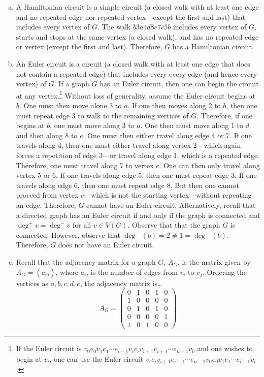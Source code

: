 \documentclass[11pt,letterpaper]{article}
\begin{document}
\sol 
\begin{enumerate}[(a)]
\item A Hamiltonian circuit is a simple circuit (a closed walk with at least one edge and no repeated edge nor repeated vertex---except the first and last) that includes every vertex of $G$. The walk $b3a1d8e7c5b$ includes every vertex of $G$, starts and stops at the same vertex (a closed walk), and has no repeated edge or vertex (except the first and last). Therefore, $G$ has a Hamiltonian circuit. \pspace
 
\item An Euler circuit is a circuit (a closed walk with at least one edge that does not contain a repeated edge) that includes every every edge (and hence every vertex) of $G$. If a graph $G$ has an Euler circuit, then one can begin the circuit at any vertex.\footnote{If the Euler circuit is $v_0 e_0 v_1 e_1 \cdots e_{i-1} v_i e_i v_{i+1} e_{i+1} \cdots e_{n-1}v_0$ and one wishes to begin at $v_i$, one can use the Euler circuit $v_i e_i v_{i+1} e_{i+1} \cdots e_{n-1} v_0 e_0 v_1 e_1 \cdots e_{i-1} v_i$.} Without loss of generality, assume the Euler circuit begins at $b$. One must then move alone 3 to $a$. If one then moves along 2 to $b$, then one must repeat edge 3 to walk to the remaining vertices of $G$. Therefore, if one begins at $b$, one must move along 3 to $a$. One then must move along 1 to $d$ and then along 8 to $e$. One must then either travel along edge 4 or 7. If one travels along 4, then one must either travel along vertex 2---which again forces a repetition of edge 3---or travel along edge 1, which is a repeated edge. Therefore, one must travel along 7 to vertex $c$. One can then only travel along vertex 5 or 6. If one travels along edge 5, then one must repeat edge 3. If one travels along edge 6, then one must repeat edge 8. But then one cannot proceed from vertex $c$---which is not the starting vertex---without repeating an edge. Therefore, $G$ cannot have an Euler circuit. Alternatively, recall that a directed graph has an Euler circuit if and only if the graph is connected and $\deg^+ v= \deg^- v$ for all $v \in V(G)$. Observe that that the graph $G$ is connected. However, observe that $\deg^-(b)= 2 \neq 1= \deg^+(b)$. Therefore, $G$ does not have an Euler circuit. \pspace

\item Recall that the adjacency matrix for a graph $G$, $A_G$, is the matrix given by $A_G= (a_{ij})$, where $a_{ij}$ is the number of edges from $v_i$ to $v_j$. Ordering the vertices as $a, b, c, d, e$, the adjacency matrix is\dots
	\[
	A_G= 
	\begin{pmatrix}
	0 & 1 & 0 & 1 & 0 \\
	1 & 0 & 0 & 0 & 0 \\
	0 & 1 & 0 & 1 & 0 \\
	0 & 0 & 0 & 0 & 1 \\
	1 & 0 & 1 & 0 & 0 
	\end{pmatrix}
	\]


\end{enumerate}
\end{document}
